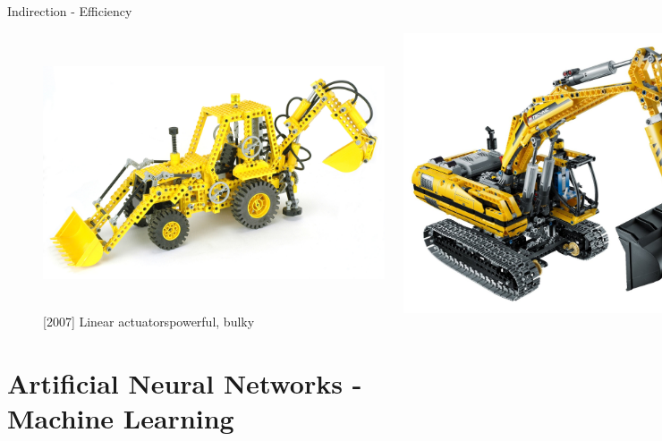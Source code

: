 \documentclass[xcolor=dvipsnames]{beamer}
\begin{document}
\begin{frame}{Indirection - Efficiency}
\begin{figure}
  \centering
  \begin{columns}
    \centering
    \caption {[1989] Pneumatics\newline flexible, weak}
    \includegraphics[width=0.9\textwidth]{1989_8862_digger}
    \centering
    \caption {[2007] Linear actuators\newline powerful, bulky}
    \includegraphics[width=0.9\textwidth]{2010_8043_excavator}
  \end{columns}
\end{figure}
\end{frame}


\section{Artificial Neural Networks - Machine Learning}
\end{document}
